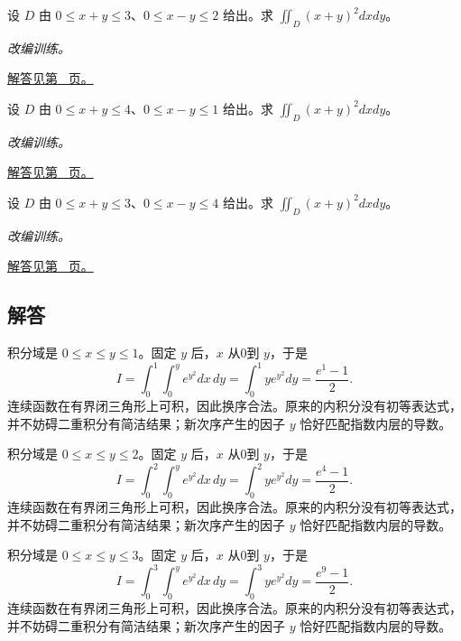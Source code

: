 \documentclass[12pt,fontset=fandol]{ctexart}
\begin{document}
\begin{example}[沿斜边界的线性换元]\label{ex:c37q22}
设 $D$ 由 $0\le x+y\le 3$、$0\le x-y\le 2$ 给出。求 $\displaystyle\iint_D(x+y)^2dxdy$。
\par\textit{改编训练。}\par\hyperref[ans:c37q22]{解答见第~\pageref{ans:c37q22} 页。}
\end{example}
\begin{example}[沿斜边界的线性换元]\label{ex:c37q23}
设 $D$ 由 $0\le x+y\le 4$、$0\le x-y\le 1$ 给出。求 $\displaystyle\iint_D(x+y)^2dxdy$。
\par\textit{改编训练。}\par\hyperref[ans:c37q23]{解答见第~\pageref{ans:c37q23} 页。}
\end{example}
\begin{example}[沿斜边界的线性换元]\label{ex:c37q24}
设 $D$ 由 $0\le x+y\le 3$、$0\le x-y\le 4$ 给出。求 $\displaystyle\iint_D(x+y)^2dxdy$。
\par\textit{改编训练。}\par\hyperref[ans:c37q24]{解答见第~\pageref{ans:c37q24} 页。}
\end{example}
\subsection{解答}
\begin{solve}\label{ans:c37q1}
积分域是 $0\le x\le y\le 1$。固定 $y$ 后，$x$ 从0到 $y$，于是
\[
I=\int_0^{1}\int_0^y e^{y^2}dx\,dy=\int_0^{1}y e^{y^2}dy=\frac{e^{1}-1}2.
\]
连续函数在有界闭三角形上可积，因此换序合法。原来的内积分没有初等表达式，并不妨碍二重积分有简洁结果；新次序产生的因子 $y$ 恰好匹配指数内层的导数。
\end{solve}

\begin{solve}\label{ans:c37q2}
积分域是 $0\le x\le y\le 2$。固定 $y$ 后，$x$ 从0到 $y$，于是
\[
I=\int_0^{2}\int_0^y e^{y^2}dx\,dy=\int_0^{2}y e^{y^2}dy=\frac{e^{4}-1}2.
\]
连续函数在有界闭三角形上可积，因此换序合法。原来的内积分没有初等表达式，并不妨碍二重积分有简洁结果；新次序产生的因子 $y$ 恰好匹配指数内层的导数。
\end{solve}

\begin{solve}\label{ans:c37q3}
积分域是 $0\le x\le y\le 3$。固定 $y$ 后，$x$ 从0到 $y$，于是
\[
I=\int_0^{3}\int_0^y e^{y^2}dx\,dy=\int_0^{3}y e^{y^2}dy=\frac{e^{9}-1}2.
\]
连续函数在有界闭三角形上可积，因此换序合法。原来的内积分没有初等表达式，并不妨碍二重积分有简洁结果；新次序产生的因子 $y$ 恰好匹配指数内层的导数。
\end{solve}
\end{document}
